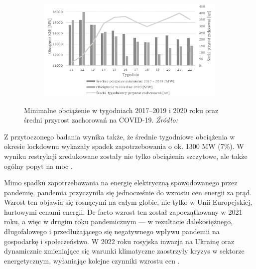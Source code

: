 \documentclass[polish, twoside, 12pt, a4paper]{article}
\theoremstyle{definition}
\theoremstyle{plain}
\theoremstyle{remark}
\begin{document}
\begin{figure}[hbt]
  \centering

  \begin{subfigure}[t]{0.45\textwidth}
    \hspace{-1.5cm}
    \includegraphics[width=1.4\textwidth]{./out_figures/figure_8}
  \end{subfigure}

  \captionsetup{margin=10pt,font=small,labelfont=bf,width=.8\textwidth}

  \caption[Minimalne obciążenie w tygodniach 2017--2019 i 2020 roku oraz średni przyrost zachorowań na COVID-19]{Minimalne obciążenie w tygodniach 2017--2019 i 2020 roku oraz średni przyrost zachorowań na COVID-19. \textit{Źródło:} \cite{stahl2021}}\label{fig:x8}
\end{figure}

Z przytoczonego badania wynika także, że średnie tygodniowe obciążenia w okresie lockdownu wykazały spadek zapotrzebowania o ok. 1300 MW (7\%). W wyniku restrykcji zredukowane zostały nie tylko obciążenia szczytowe, ale także ogólny popyt na moc \parencite{stahl2021}.

Mimo spadku zapotrzebowania na energię elektryczną spowodowanego przez pandemię, pandemia przyczyniła się jednocześnie do wzrostu cen energii za prąd. Wzrost ten objawia się rosnącymi na całym globie, nie tylko w Unii Europejskiej, hurtowymi cenami energii. De facto wzrost ten został zapoczątkowany w 2021 roku, a więc w drugim roku pandemicznym --- w rezultacie dalekosiężnego, długofalowego i przedłużającego się negatywnego wpływu pandemii na gospodarkę i społeczeństwo. W 2022 roku rosyjska inwazja na Ukrainę oraz dynamicznie zmieniające się warunki klimatyczne zaostrzyły kryzys w sektorze energetycznym, wyłaniając kolejne czynniki wzrostu cen \parencite{council2023}. 
\end{document}
